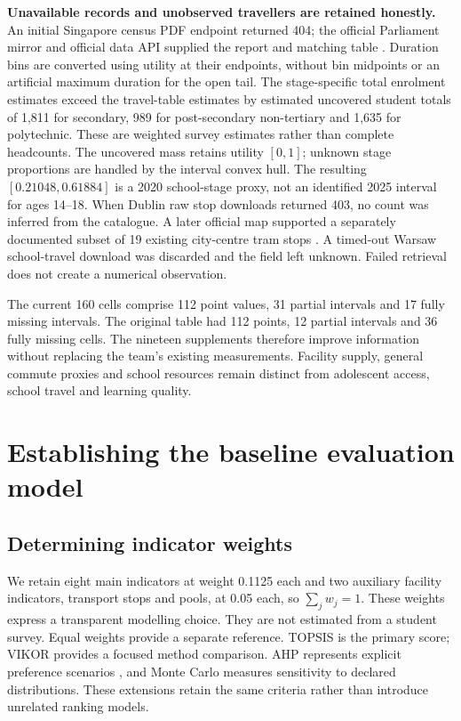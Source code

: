 \textbf{Unavailable records and unobserved travellers are retained honestly.}
An initial Singapore census PDF endpoint returned 404; the official Parliament
mirror and official data API supplied the report and matching table
\cite{singapore}. Duration bins are converted using utility at their endpoints,
without bin midpoints or an artificial maximum duration for the open tail.
The stage-specific total enrolment estimates exceed the travel-table estimates
by estimated uncovered student totals of 1,811 for secondary, 989 for
post-secondary non-tertiary and 1,635 for polytechnic. These are weighted
survey estimates rather than complete headcounts. The uncovered mass retains
utility $[0,1]$; unknown stage proportions are
handled by the interval convex hull. The resulting $[0.21048,0.61884]$ is a
2020 school-stage proxy, not an identified 2025 interval for ages 14--18.
When Dublin raw stop downloads returned 403, no count was inferred from the
catalogue. A later official map supported a separately documented subset of
19 existing city-centre tram stops \cite{dublin}. A timed-out Warsaw school-travel download
was discarded and the field left unknown. Failed retrieval does not create a
numerical observation.

The current 160 cells comprise 112 point values, 31 partial intervals and
17 fully missing intervals. The original table had 112 points, 12 partial
intervals and 36 fully missing cells. The nineteen supplements therefore improve
information without replacing the team's existing measurements. Facility supply,
general commute proxies and school resources remain distinct from adolescent
access, school travel and learning quality.

\section{Establishing the baseline evaluation model}
\subsection{Determining indicator weights}
We retain eight main indicators at weight 0.1125 each and two auxiliary facility
indicators, transport stops and pools, at 0.05 each, so $\sum_jw_j=1$.
These weights express a transparent modelling choice. They are not estimated
from a student survey. Equal weights provide a separate reference.
TOPSIS is the primary score; VIKOR provides a focused method comparison.
AHP represents explicit preference scenarios \cite{saaty}, and Monte Carlo measures
sensitivity to declared distributions. These extensions retain the same
criteria rather than introduce unrelated ranking models.

